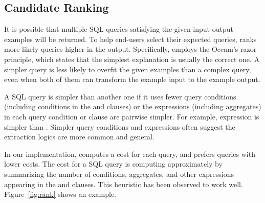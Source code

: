 \subsection{Candidate Ranking}
\label{sec:ranking}


It is possible that multiple SQL queries satisfying
the given input-output examples will be returned.
To help end-users select their expected queries,
\ourtool ranks more likely queries higher in the output.
Specifically, \ourtool employs
the Occam's razor principle, which states that the
simplest explanation is usually the correct one.
A simpler query is less likely to overfit the given examples
than a complex query, even when both of them
can transform the example input to the example output.


A SQL query is simpler than another one if it uses
fewer query conditions (including conditions in the 
and  clauses) or the expressions (including
aggregates) in each query condition or clause are pairwise simpler.
For example, expression  is simpler than
.
Simpler query conditions and expressions often suggest the extraction logics
are more common and general.

In our implementation, \ourtool computes a cost for each
query, and prefers queries with lower costs. The cost
for a SQL query is computing approximately by summarizing
the number of conditions, aggregates,
and other expressions
appearing in the  and  clauses.
This heuristic has been observed
to work well.
Figure~\ref{fig:rank} shows an example.


